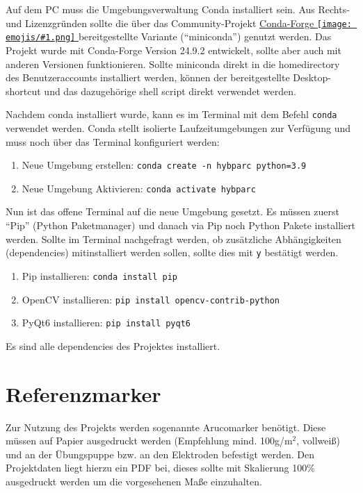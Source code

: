 \documentclass[a4paper, 10pt]{article}
\newcommand{\code}[1]{\texttt{#1}}
\newcommand{\emoji}[1]{
    \begingroup\normalfont
    \texttt{[image: emojis/\#1.png]}
    \endgroup
}
\begin{document}
Auf dem PC muss die Umgebungsverwaltung Conda installiert sein. Aus Rechts- und Lizenzgründen sollte die über das Community-Projekt \href{https://conda-forge.org/}{Conda-Forge\emoji{link}} bereitgestellte Variante (\enquote{miniconda}) genutzt werden. Das Projekt wurde mit Conda-Forge Version 24.9.2 entwickelt, sollte aber auch mit anderen Versionen funktionieren. Sollte miniconda direkt in die homedirectory des Benutzeraccounts installiert werden, können der bereitgestellte Desktop-shortcut und das dazugehörige shell script direkt verwendet werden.

Nachdem conda installiert wurde, kann es im Terminal mit dem Befehl \code{conda} verwendet werden. Conda stellt isolierte Laufzeitumgebungen zur Verfügung und muss noch über das Terminal konfiguriert werden:
\begin{enumerate}
    \item Neue Umgebung erstellen: \code{conda create -n hybparc python=3.9}
    \item Neue Umgebung Aktivieren: \code{conda activate hybparc}
\end{enumerate}

Nun ist das offene Terminal auf die neue Umgebung gesetzt. Es müssen zuerst \enquote{Pip} (Python Paketmanager) und danach via Pip noch Python Pakete installiert werden. Sollte im Terminal nachgefragt werden, ob zusätzliche Abhängigkeiten (dependencies) mitinstalliert werden sollen, sollte dies mit \code{y} bestätigt werden.

\begin{enumerate}
    \item Pip installieren: \code{conda install pip}
    \item OpenCV installieren: \code{pip install opencv-contrib-python}
    \item PyQt6 installieren: \code{pip install pyqt6}
\end{enumerate}

Es sind alle dependencies des Projektes installiert.

\section{Referenzmarker}
\label{sec:ref-markers}
Zur Nutzung des Projekts werden sogenannte Arucomarker benötigt. Diese müssen auf Papier ausgedruckt werden (Empfehlung mind. 100g/m$^2$, vollweiß) und an der Übungspuppe bzw. an den Elektroden befestigt werden. Den Projektdaten liegt hierzu ein PDF bei, dieses sollte mit Skalierung 100\% ausgedruckt werden um die vorgesehenen Maße einzuhalten.
\end{document}
